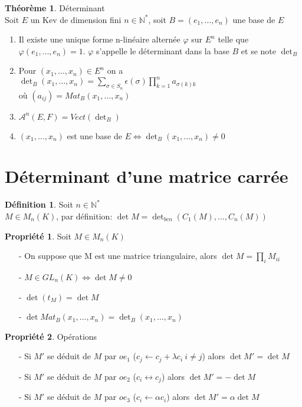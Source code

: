 \documentclass[fleqn]{article}
\theoremstyle{definition} \newtheorem*{defi}{D\'efinition}
\theoremstyle{definition} \newtheorem*{theo}{Th\'eor\`eme}
\theoremstyle{definition} \newtheorem*{coro}{Corollaire}
\theoremstyle{definition} \newtheorem*{nota}{Notation}
\theoremstyle{definition} \newtheorem*{vocab}{Vocabulaire}
\theoremstyle{remark} \newtheorem*{rqs}{Remarques}
\theoremstyle{definition} \newtheorem*{prop}{Propri\'et\'e}
\begin{document}
\begin{theo} D\'eterminant\\
	Soit $E$ un Kev de dimension fini $n \in \mathbb{N}^*$, soit $B = (e_1, \hdots, e_n)$ une base de $E$
	\begin{enumerate}
		\item Il existe une unique forme n-lin\'eaire altern\'ee $\varphi$ sur $E^n$ telle que \mbox{$\varphi(e_1, \hdots, e_n) = 1$}. $\varphi$
			s'appelle le d\'eterminant dans la base $B$ et se note $\det_B$
		\item Pour $(x_1, \hdots, x_n) \in E^n$ on a $\det_B(x_1, \hdots, x_n) = \sum_{\sigma \in S_n} \epsilon(\sigma) \prod_{k=1}^n
			a_{\sigma(k) k}$\\ o\`u $(a_{ij}) = Mat_B(x_1, \hdots, x_n)$
		\item $\mathscr{A}^n(E,F) = Vect(\det_B)$
		\item $(x_1, \hdots, x_n)$ est une base de $E \Leftrightarrow \det_B (x_1, \hdots, x_n) \neq 0$
	\end{enumerate}
\end{theo}

\section{D\'eterminant d'une matrice carr\'ee}
\begin{defi} Soit $n \in \mathbb{N}^*$\\
	$M \in M_n(K)$, par d\'efinition: $\det M = \det_{bcn} (C_1(M), \hdots, C_n(M))$
\end{defi}

\begin{prop} Soit $M \in M_n(K)$
	\begin{enumerate}
		\item [-] On suppose que M est une matrice triangulaire, alors $\det M = \prod_i M_{ii}$
		\item [-] $M \in GL_n(K) \Leftrightarrow \det M \neq 0$
		\item [-] $\det (t_M) = \det M$
		\item [-] $\det Mat_B(x_1, \hdots, x_n) = \det_B (x_1, \hdots, x_n)$
	\end{enumerate}
\end{prop}

\begin{prop} Op\'erations
	\begin{enumerate}
		\item [-] Si $M'$ se d\'eduit de $M$ par $oe_1$ ($c_j \leftarrow c_j + \lambda c_i\ i \neq j$) alors $\det M' = \det M$
		\item [-] Si $M'$ se d\'eduit de $M$ par $oe_2$ ($c_i \leftrightarrow c_j$) alors $\det M' = -\det M$
		\item [-] Si $M'$ se d\'eduit de $M$ par $oe_3$ ($c_i \leftarrow \alpha c_i$) alors $\det M' = \alpha \det M$
	\end{enumerate}
\end{prop}
\end{document}
